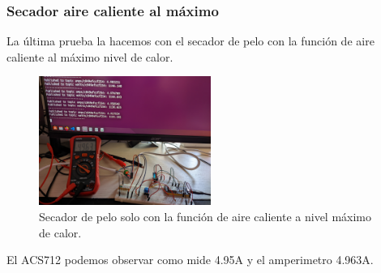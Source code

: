 \begin{titlepage}
\subsubsection{Secador aire caliente al máximo}
La última prueba la hacemos con el secador de pelo con la función de aire caliente al máximo nivel de calor.\\
\begin{figure}[h!]
	\centering
	\includegraphics[width=0.5\textwidth]{imagenes/AC_4_9Amps.jpg}
	\caption{Secador de pelo solo con la función de aire caliente a nivel máximo de calor.}
\end{figure}
El ACS712 podemos observar como mide 4.95A y el amperimetro 4.963A.\\

\newpage
\end{titlepage}
